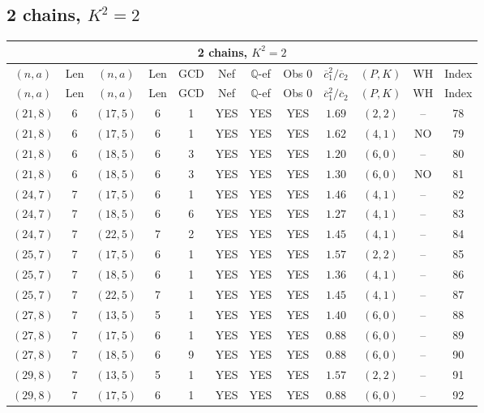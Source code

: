 \subsection{2 chains, $K^2 = 2$}
\begin{longtable}{|c|c|c|c|c|c|c|c|c|c|c|c|}
\hline
\multicolumn{12}{|c|}{2 chains, $K^2 = 2$}\\
\hline
$(n,a)$ & Len & $(n,a)$ & Len & GCD & Nef & $\mathbb Q$-ef & Obs 0 & $\overline c_1^2 / \overline c_2$ & $(P,K)$ & WH & Index\\
\hline
\endfirsthead

\hline
$(n,a)$ & Len & $(n,a)$ & Len & GCD & Nef & $\mathbb Q$-ef & Obs 0 & $\overline c_1^2 / \overline c_2$ & $(P,K)$ & WH & Index\\
\hline
\endhead
\hline
\endfoot

$(21,8)$ & 6 & $(17,5)$ & 6 & 1 & YES & YES & YES & $1.69$ & $(2,2)$ & -- & 78\\
$(21,8)$ & 6 & $(17,5)$ & 6 & 1 & YES & YES & YES & $1.62$ & $(4,1)$ & NO & 79\\
$(21,8)$ & 6 & $(18,5)$ & 6 & 3 & YES & YES & YES & $1.20$ & $(6,0)$ & -- & 80\\
$(21,8)$ & 6 & $(18,5)$ & 6 & 3 & YES & YES & YES & $1.30$ & $(6,0)$ & NO & 81\\
$(24,7)$ & 7 & $(17,5)$ & 6 & 1 & YES & YES & YES & $1.46$ & $(4,1)$ & -- & 82\\
$(24,7)$ & 7 & $(18,5)$ & 6 & 6 & YES & YES & YES & $1.27$ & $(4,1)$ & -- & 83\\
$(24,7)$ & 7 & $(22,5)$ & 7 & 2 & YES & YES & YES & $1.45$ & $(4,1)$ & -- & 84\\
$(25,7)$ & 7 & $(17,5)$ & 6 & 1 & YES & YES & YES & $1.57$ & $(2,2)$ & -- & 85\\
$(25,7)$ & 7 & $(18,5)$ & 6 & 1 & YES & YES & YES & $1.36$ & $(4,1)$ & -- & 86\\
$(25,7)$ & 7 & $(22,5)$ & 7 & 1 & YES & YES & YES & $1.45$ & $(4,1)$ & -- & 87\\
$(27,8)$ & 7 & $(13,5)$ & 5 & 1 & YES & YES & YES & $1.40$ & $(6,0)$ & -- & 88\\
$(27,8)$ & 7 & $(17,5)$ & 6 & 1 & YES & YES & YES & $0.88$ & $(6,0)$ & -- & 89\\
$(27,8)$ & 7 & $(18,5)$ & 6 & 9 & YES & YES & YES & $0.88$ & $(6,0)$ & -- & 90\\
$(29,8)$ & 7 & $(13,5)$ & 5 & 1 & YES & YES & YES & $1.57$ & $(2,2)$ & -- & 91\\
$(29,8)$ & 7 & $(17,5)$ & 6 & 1 & YES & YES & YES & $0.88$ & $(6,0)$ & -- & 92\\

\end{longtable}
